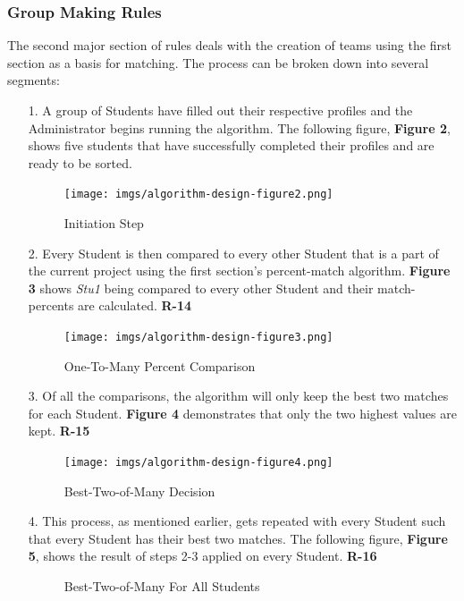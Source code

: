 \documentclass[12pt,letterpaper]{article}
\begin{document}
\subsubsection*{Group Making Rules}
The second major section of rules deals with the creation of teams using the first section as a basis for matching. The process can be broken down into several segments:
\begin{enumerate}
	\item[1.] A group of Students have filled out their respective profiles and the Administrator begins running the algorithm. The following figure, {\bf Figure 2}, shows five students that have successfully completed their profiles and are ready to be sorted. 
\begin{figure}[H]
	\caption{Initiation Step}
	\begin{center}
		\texttt{[image: imgs/algorithm-design-figure2.png]}
	\end{center}
\end{figure}
	\item[2.] Every Student is then compared to every other Student that is a part of the current project using the first section's percent-match algorithm. {\bf Figure 3} shows {\it Stu1} being compared to every other Student and their match-percents are calculated. {\bf R-14}
\begin{figure}[H]
	\caption{One-To-Many Percent Comparison}
	\begin{center}
		\texttt{[image: imgs/algorithm-design-figure3.png]}
	\end{center}
\end{figure}
	\item[3.] Of all the comparisons, the algorithm will only keep the best two matches for each Student. {\bf Figure 4} demonstrates that only the two highest values are kept. {\bf R-15}
\begin{figure}[H]
	\caption{Best-Two-of-Many Decision}
	\begin{center}
		\texttt{[image: imgs/algorithm-design-figure4.png]}
	\end{center}
\end{figure}
	\item[4.] This process, as mentioned earlier, gets repeated with every Student such that every Student has their best two matches. The following figure, {\bf Figure 5}, shows the result of steps 2-3 applied on every Student. {\bf R-16}
\begin{figure}[H]
	\caption{Best-Two-of-Many For All Students}
	\begin{center}

\end{center}
\end{figure}
\end{enumerate}
\end{document}
